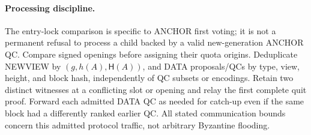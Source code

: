 \documentclass[11pt,a4paper]{article}
\newcommand{\Hash}{\mathsf H}
\newcounter{protocol}
\begin{document}
\paragraph{Processing discipline.}
The entry-lock comparison is specific to ANCHOR first voting; it is not
a permanent refusal to process a child backed by a valid new-generation
ANCHOR QC. Compare signed openings before assigning their quota origins.
Deduplicate NEWVIEW by $(g,h(A),\Hash(A))$, and DATA proposals/QCs by
type, view, height, and block hash, independently of QC subsets or encodings.
Retain two distinct witnesses at a conflicting slot or opening and relay
the first complete quit proof. Forward each admitted DATA QC as needed
for catch-up even if the same block had a differently ranked earlier QC.
All stated communication bounds concern this admitted protocol traffic,
not arbitrary Byzantine flooding.
\end{document}
